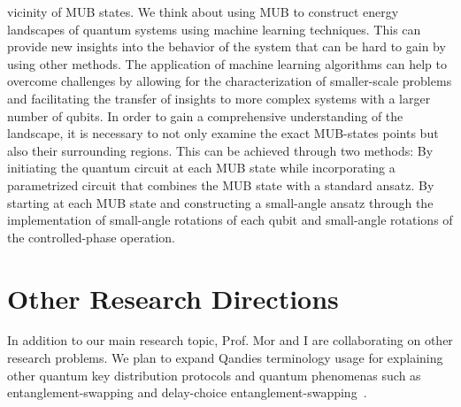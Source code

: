 \documentclass[12pt, a4paper]{article}
\begin{document}
    vicinity of MUB states.
    We think about using MUB to construct energy landscapes of quantum systems using machine learning techniques.
    This can provide new insights into the behavior of the system that can be hard to gain by using other methods.
    The application of machine learning algorithms can help to overcome challenges by allowing for the
    characterization of smaller-scale problems and facilitating the transfer of insights to more complex systems with a
    larger number of qubits.
    In order to gain a comprehensive understanding of the landscape, it is necessary to not only examine the exact
    MUB-states points but also their surrounding regions.
    This can be achieved through two methods:
    By initiating the quantum circuit at each MUB state while incorporating a parametrized circuit that combines the MUB state
    with a standard ansatz.
    By starting at each MUB state and constructing a small-angle ansatz through the implementation of small-angle
    rotations of each qubit and small-angle rotations of the controlled-phase operation.


    \section{Other Research Directions}\label{sec:other-research-directions}
    In addition to our main research topic, Prof. Mor and I are collaborating on other research problems.
    We plan to expand Qandies \cite{lin2020quantum} \cite{lin2021quantum} \cite{mor2022digital} terminology
    usage for explaining other quantum key distribution protocols and quantum phenomenas such as
    entanglement-swapping and delay-choice entanglement-swapping~\cite{ma2016delayed}.

    
    
\end{document}
